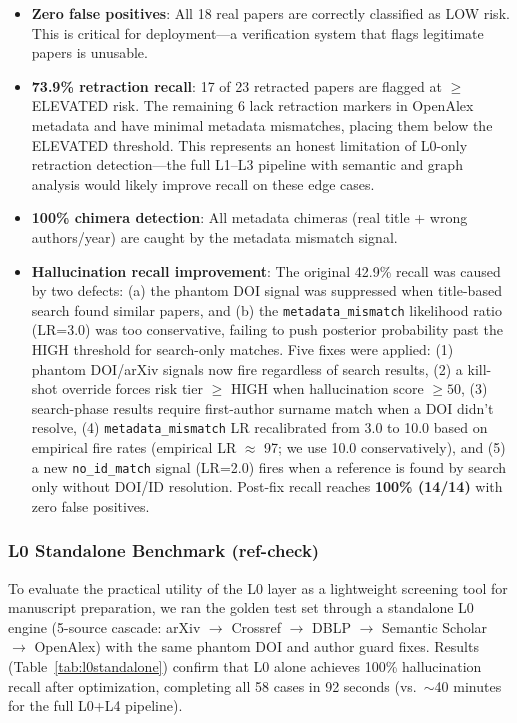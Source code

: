 \documentclass[sigconf,nonacm]{acmart}
\begin{document}
\begin{itemize}[leftmargin=*]
    \item \textbf{Zero false positives}: All 18 real papers are correctly classified as LOW risk. This is critical for deployment---a verification system that flags legitimate papers is unusable.

    \item \textbf{73.9\% retraction recall}: 17 of 23 retracted papers are flagged at $\geq$ ELEVATED risk. The remaining 6 lack retraction markers in OpenAlex metadata and have minimal metadata mismatches, placing them below the ELEVATED threshold. This represents an honest limitation of L0-only retraction detection---the full L1--L3 pipeline with semantic and graph analysis would likely improve recall on these edge cases.

    \item \textbf{100\% chimera detection}: All metadata chimeras (real title + wrong authors/year) are caught by the metadata mismatch signal.

    \item \textbf{Hallucination recall improvement}: The original 42.9\% recall was caused by two defects: (a) the phantom DOI signal was suppressed when title-based search found similar papers, and (b) the \texttt{metadata\_mismatch} likelihood ratio (LR=3.0) was too conservative, failing to push posterior probability past the HIGH threshold for search-only matches. Five fixes were applied: (1) phantom DOI/arXiv signals now fire regardless of search results, (2) a kill-shot override forces risk tier $\geq$ HIGH when hallucination score $\geq 50$, (3) search-phase results require first-author surname match when a DOI didn't resolve, (4) \texttt{metadata\_mismatch} LR recalibrated from 3.0 to 10.0 based on empirical fire rates (empirical LR $\approx$ 97; we use 10.0 conservatively), and (5) a new \texttt{no\_id\_match} signal (LR=2.0) fires when a reference is found by search only without DOI/ID resolution. Post-fix recall reaches \textbf{100\% (14/14)} with zero false positives.
\end{itemize}

\subsubsection{L0 Standalone Benchmark (ref-check)}

To evaluate the practical utility of the L0 layer as a lightweight screening tool for manuscript preparation, we ran the golden test set through a standalone L0 engine (5-source cascade: arXiv $\rightarrow$ Crossref $\rightarrow$ DBLP $\rightarrow$ Semantic Scholar $\rightarrow$ OpenAlex) with the same phantom DOI and author guard fixes.
Results (Table~\ref{tab:l0standalone}) confirm that L0 alone achieves 100\% hallucination recall after optimization, completing all 58 cases in 92 seconds (vs.\ $\sim$40 minutes for the full L0+L4 pipeline).
\end{document}
